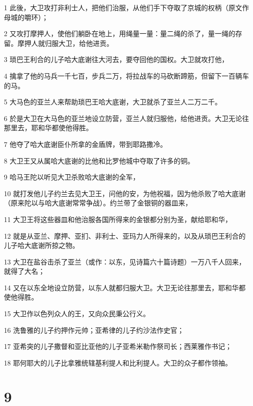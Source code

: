 \par 1 此後，大卫攻打非利士人，把他们治服，从他们手下夺取了京城的权柄（原文作母城的嚼环）；
\par 2 又攻打摩押人，使他们躺卧在地上，用绳量一量：量二绳的杀了，量一绳的存留。摩押人就归服大卫，给他进贡。
\par 3 琐巴王利合的儿子哈大底谢往大河去，要夺回他的国权。大卫就攻打他，
\par 4 擒拿了他的马兵一千七百，步兵二万，将拉战车的马砍断蹄筋，但留下一百辆车的马。
\par 5 大马色的亚兰人来帮助琐巴王哈大底谢，大卫就杀了亚兰人二万二千。
\par 6 於是大卫在大马色的亚兰地设立防营，亚兰人就归服他，给他进贡。大卫无论往那里去，耶和华都使他得胜。
\par 7 他夺了哈大底谢臣仆所拿的金盾牌，带到耶路撒冷。
\par 8 大卫王又从属哈大底谢的比他和比罗他城中夺取了许多的铜。
\par 9 哈马王陀以听见大卫杀败哈大底谢的全军，
\par 10 就打发他儿子约兰去见大卫王，问他的安，为他祝福，因为他杀败了哈大底谢（原来陀以与哈大底谢常常争战）。约兰带了金银铜的器皿来，
\par 11 大卫王将这些器皿和他治服各国所得来的金银都分别为圣，献给耶和华，
\par 12 就是从亚兰、摩押、亚扪、非利士、亚玛力人所得来的，以及从琐巴王利合的儿子哈大底谢所掠之物。
\par 13 大卫在盐谷击杀了亚兰（或作：以东，见诗篇六十篇诗题）一万八千人回来，就得了大名；
\par 14 又在以东全地设立防营，以东人就都归服大卫。大卫无论往那里去，耶和华都使他得胜。
\par 15 大卫作以色列众人的王，又向众民秉公行义。
\par 16 洗鲁雅的儿子约押作元帅；亚希律的儿子约沙法作史官；
\par 17 亚希突的儿子撒督和亚比亚他的儿子亚希米勒作祭司长；西莱雅作书记；
\par 18 耶何耶大的儿子比拿雅统辖基利提人和比利提人。大卫的众子都作领袖。

\chapter{9}

